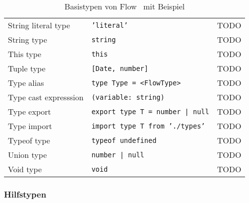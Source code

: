 \begin{table}[tbp]
\begin{tabularx}{\textwidth}{@{}llX@{}}
    String literal type        & \texttt{'literal'}                       & TODO \\
    String type                & \texttt{string}                          & TODO \\
    This type                  & \texttt{this}                            & TODO \\
    Tuple type                 & \texttt{{[}Date, number{]}}              & TODO \\
    Type alias                 & \texttt{type Type = <{}FlowType>{}}      & TODO \\
    Type cast expresssion      & \texttt{(variable: string)}              & TODO \\
    Type export                & \texttt{export type T = number | null}   & TODO \\
    Type import                & \texttt{import type T from './types'}    & TODO \\
    Typeof type                & \texttt{typeof undefined}                & TODO \\
    Union type                 & \texttt{number | null}                   & TODO \\
    Void type                  & \texttt{void}                            & TODO \\
    \midrule
  \end{tabularx}
  \caption{Basistypen von Flow~\autocite{FLOW:TYPE_ANNOTATIONS} mit Beispiel}
  \label{tab:flow-base-types}
\end{table}

\subsubsection{Hilfstypen}
\label{subsection:flow:utility-types}

